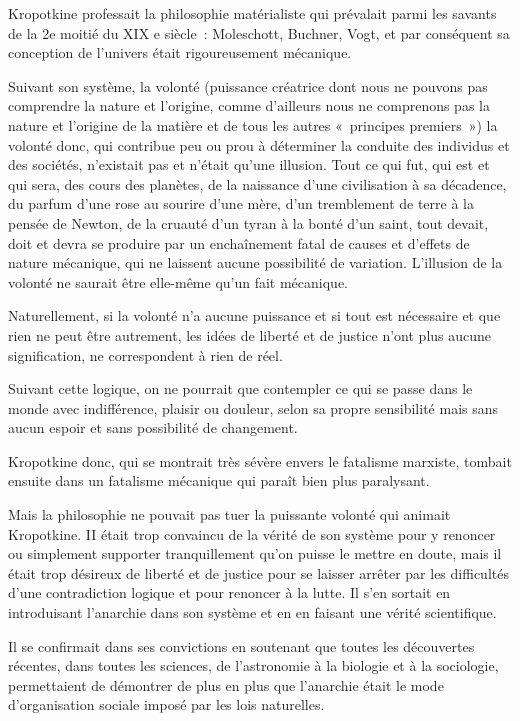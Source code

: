 \documentclass[french,twoside]{book} %
\begin{document}
Kropotkine professait la philosophie matérialiste qui prévalait parmi les savants de la 2e moitié du XIX e siècle : Moleschott, Buchner, Vogt, et par conséquent sa conception de l’univers était rigoureusement mécanique.\par
Suivant son système, la volonté (puissance créatrice dont nous ne pouvons pas comprendre la nature et l’origine, comme d’ailleurs nous ne comprenons pas la nature et l’origine de la matière et de tous les autres « principes premiers ») la volonté donc, qui contribue peu ou prou à déterminer la conduite des individus et des sociétés, n’existait pas et n’était qu’une illusion. Tout ce qui fut, qui est et qui sera, des cours des planètes, de la naissance d’une civilisation à sa décadence, du parfum d’une rose au sourire d’une mère, d’un tremblement de terre à la pensée de Newton, de la cruauté d’un tyran à la bonté d’un saint, tout devait, doit et devra se produire par un enchaînement fatal de causes et d’effets de nature mécanique, qui ne laissent aucune possibilité de variation. L'illusion de la volonté ne saurait être elle-même qu’un fait mécanique.\par
Naturellement, si la volonté n’a aucune puissance et si tout est nécessaire et que rien ne peut être autrement, les idées de liberté et de justice n’ont plus aucune signification, ne correspondent à rien de réel.\par
Suivant cette logique, on ne pourrait que contempler ce qui se passe dans le monde avec indifférence, plaisir ou douleur, selon sa propre sensibilité mais sans aucun espoir et sans possibilité de changement.\par
Kropotkine donc, qui se montrait très sévère envers le fatalisme marxiste, tombait ensuite dans un fatalisme mécanique qui paraît bien plus paralysant.\par
Mais la philosophie ne pouvait pas tuer la puissante volonté qui animait Kropotkine. II était trop convaincu de la vérité de son système pour y renoncer ou simplement supporter tranquillement qu’on puisse le mettre en doute, mais il était trop désireux de liberté et de justice pour se laisser arrêter par les difficultés d’une contradiction logique et pour renoncer à la lutte. Il s’en sortait en introduisant l’anarchie dans son système et en en faisant une vérité scientifique.\par
Il se confirmait dans ses convictions en soutenant que toutes les découvertes récentes, dans toutes les sciences, de l’astronomie à la biologie et à la sociologie, permettaient de démontrer de plus en plus que l’anarchie était le mode d’organisation sociale imposé par les lois naturelles.\par
\end{document}
